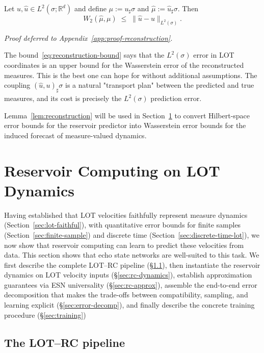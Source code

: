 \documentclass[11pt]{article}
\newcommand{\R}{\mathbb{R}}
\newcommand{\1}{\mathbf{1}}
\begin{document}
\begin{lemma}\label{lem:reconstruction}
Let $u,\widehat{u} \in L^2(\sigma;\R^d)$ and define $\mu := u_\sharp \sigma$ and
$\widehat{\mu} := \widehat{u}_\sharp \sigma$. Then
\begin{equation}\label{eq:reconstruction-bound}
W_2(\widehat{\mu},\mu) \;\le\; \|\widehat{u} - u\|_{L^2(\sigma)}.
\end{equation}
\end{lemma}
\noindent\emph{Proof deferred to Appendix~\ref{app:proof-reconstruction}.}

The bound~\eqref{eq:reconstruction-bound} says that the $L^2(\sigma)$ error in LOT coordinates is an upper bound for the Wasserstein error of the reconstructed measures. This is the best one can hope for without additional assumptions. The coupling $(\widehat{u}, u)_\sharp \sigma$ is a natural "transport plan" between the predicted and true measures, and its cost is precisely the $L^2(\sigma)$ prediction error.

Lemma~\ref{lem:reconstruction} will be used in Section~\ref{sec:rc-theory} to convert Hilbert-space error bounds for the reservoir predictor into Wasserstein error bounds for the induced forecast of measure-valued dynamics. 

\section{Reservoir Computing on LOT Dynamics}
\label{sec:rc-theory}

Having established that LOT velocities faithfully represent measure
dynamics (Section~\ref{sec:lot-faithful}), with quantitative error bounds
for finite samples (Section~\ref{sec:finite-sample}) and discrete time
(Section~\ref{sec:discrete-time-lot}), we now show that reservoir computing
can learn to predict these velocities from data. This section shows that echo state networks are well-suited to this task. We first describe the complete LOT--RC pipeline (\S\ref{sec:pipeline}), then instantiate the reservoir dynamics on LOT
velocity inputs (\S\ref{sec:rc-dynamics}), establish approximation
guarantees via ESN universality (\S\ref{sec:rc-approx}), assemble the
end-to-end error decomposition that makes the trade-offs between
compatibility, sampling, and learning explicit (\S\ref{sec:error-decomp}),
and finally describe the concrete training procedure (\S\ref{sec:training})


\subsection{The LOT--RC pipeline}\label{sec:pipeline}
\end{document}
